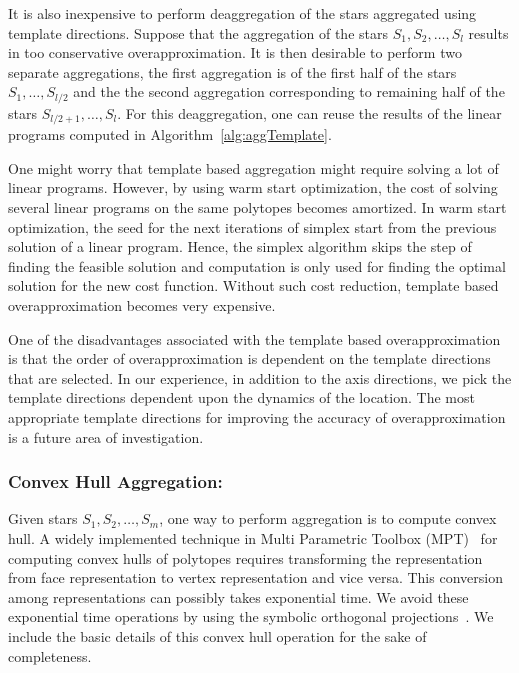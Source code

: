 It is also inexpensive to perform deaggregation of the stars aggregated using template directions. 
%
Suppose that the aggregation of the stars $S_1, S_2, \ldots, S_l$ results in too conservative overapproximation. 
%
It is then desirable to perform two separate aggregations, the first aggregation is of the first half of the stars $S_1, \ldots, S_{l/2}$ and the the second aggregation corresponding to remaining half of the stars $S_{l/2+1}, \ldots, S_{l}$. 
%
For this deaggregation, one can reuse the results of the linear programs computed in Algorithm~\ref{alg:aggTemplate}.

One might worry that template based aggregation might require solving a lot of linear programs. 
%
However, by using warm start optimization, the cost of solving several linear programs on the same polytopes becomes amortized. 
%
In warm start optimization, the seed for the next iterations of simplex start from the previous solution of a linear program.
%
Hence, the simplex algorithm skips the step of finding the feasible solution and computation is only used for finding the optimal solution for the new cost function.
%
Without such cost reduction, template based overapproximation becomes very expensive. 
%

One of the disadvantages associated with the template based overapproximation is that the order of overapproximation is dependent on the template directions that are selected. 
%
In our experience, in addition to the axis directions, we pick the template directions dependent upon the dynamics of the location. 
%
The most appropriate template directions for improving the accuracy of overapproximation is a future area of investigation.

\subsubsection{Convex Hull Aggregation:}
\label{sec:convexhullAgg}
Given stars $S_1, S_2, \ldots, S_m$, one way to perform aggregation is to compute convex hull. 
%
A widely implemented technique in Multi Parametric Toolbox (MPT)~\cite{kvasnica2004multi} for computing convex hulls of polytopes requires transforming the representation from face representation to vertex representation and vice versa. 
%
This conversion among representations can possibly takes exponential time. 
%
We avoid these exponential time operations by using the symbolic orthogonal projections~\cite{hagemann2014reachability}. 
%
We include the basic details of this convex hull operation for the sake of completeness.

